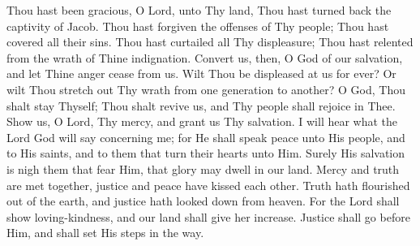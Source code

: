 Thou hast been gracious, O Lord, unto Thy land, Thou hast turned back the captivity of Jacob. Thou hast forgiven the offenses of Thy people; Thou hast covered all their sins. Thou hast curtailed all Thy displeasure; Thou hast relented from the wrath of Thine indignation. Convert us, then, O God of our salvation, and let Thine anger cease from us. Wilt Thou be displeased at us for ever? Or wilt Thou stretch out Thy wrath from one generation to another? O God, Thou shalt stay Thyself; Thou shalt revive us, and Thy people shall rejoice in Thee. Show us, O Lord, Thy mercy, and grant us Thy salvation. I will hear what the Lord God will say concerning me; for He shall speak peace unto His people, and to His saints, and to them that turn their hearts unto Him. Surely His salvation is nigh them that fear Him, that glory may dwell in our land. Mercy and truth are met together, justice and peace have kissed each other. Truth hath flourished out of the earth, and justice hath looked down from heaven. For the Lord shall show loving-kindness, and our land shall give her increase. Justice shall go before Him, and shall set His steps in the way.
